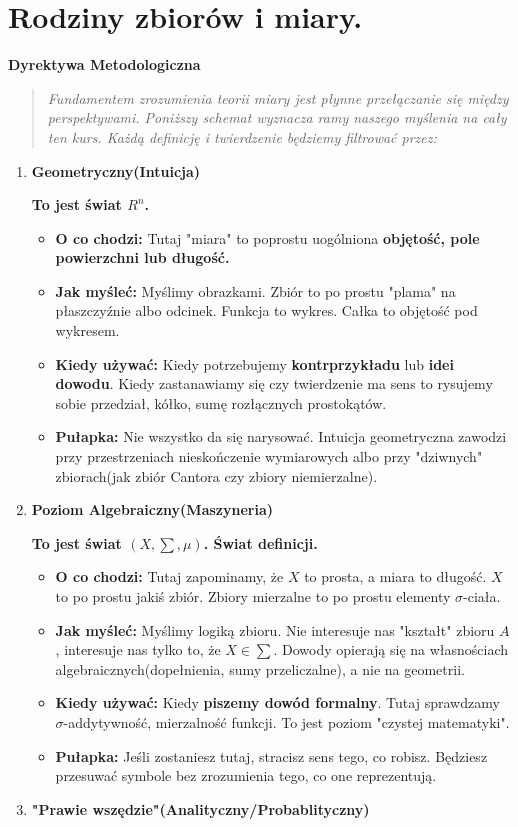 \chapter{Rodziny zbiorów i miary.}
\begin{center}
    \textbf{\large Dyrektywa Metodologiczna}
\end{center}

\begin{quote}
    \textit{Fundamentem zrozumienia teorii miary jest płynne przełączanie się między perspektywami. Poniższy schemat wyznacza ramy naszego myślenia na cały ten kurs. Każdą definicję i twierdzenie będziemy filtrować przez:}
\end{quote}

\begin{enumerate}[label=\textbf{Poziom  \arabic*.}, wide]
	\item \textbf{Geometryczny(Intuicja)} 

		\textbf{To jest świat $R^{n}$.} 
		\begin{itemize}
			\item \textbf{O co chodzi:} Tutaj "miara" to poprostu uogólniona \textbf{objętość, pole powierzchni lub długość.} 
			\item \textbf{Jak myśleć:} Myślimy obrazkami. Zbiór to po prostu "plama" na płaszczyźnie albo odcinek. Funkcja to wykres. Całka to objętość pod wykresem.
			\item \textbf{Kiedy używać:} Kiedy potrzebujemy \textbf{kontrprzykładu} lub \textbf{idei dowodu}. Kiedy zastanawiamy się czy twierdzenie ma sens to rysujemy sobie przedział, kółko, sumę rozłącznych prostokątów.
			\item \textbf{Pułapka:} Nie wszystko da się narysować. Intuicja geometryczna zawodzi przy przestrzeniach nieskończenie wymiarowych albo przy "dziwnych" zbiorach(jak zbiór Cantora czy zbiory niemierzalne). 
		\end{itemize}
	\item \textbf{Poziom Algebraiczny(Maszyneria)}

		\textbf{To jest świat $\left( X, \sum, \mu \right) $. Świat definicji.} 
		\begin{itemize}
			\item \textbf{O co chodzi:} Tutaj zapominamy, że $X$ to prosta, a miara to długość. $X$ to po prostu jakiś zbiór. Zbiory mierzalne to po prostu elementy $\sigma$-ciała. 
			\item \textbf{Jak myśleć:} Myślimy logiką zbioru. Nie interesuje nas "kształt" zbioru $A$, interesuje nas tylko to, że  $X \in \sum$. Dowody opierają się na własnościach algebraicznych(dopełnienia, sumy przeliczalne), a nie na geometrii.
			\item \textbf{Kiedy używać:} Kiedy \textbf{piszemy dowód formalny}. Tutaj sprawdzamy $\sigma$-addytywność, mierzalność funkcji. To jest poziom "czystej matematyki".
			\item \textbf{Pułapka:} Jeśli zostaniesz tutaj, stracisz sens tego, co robisz. Będziesz przesuwać symbole bez zrozumienia tego, co one reprezentują. 
		\end{itemize}
	\item \textbf{"Prawie wszędzie"(Analityczny/Probablityczny)}


\end{enumerate}
